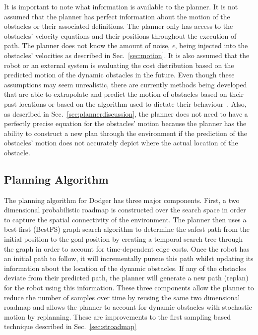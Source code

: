 \documentclass[letterpaper, 10pt, conference]{ieeeconf}
\begin{document}
It is important to note what information is available to the planner. It is not
assumed that the planner has perfect information about the motion of the
obstacles or their associated definitions. The planner only has access to the
obstacles' velocity equations and their positions throughout the execution of
path.  The planner does not know the amount of noise, $\epsilon$, being
injected into the obstacles' velocities as described in Sec.~\ref{sec:motion}.
It is also assumed that the robot or an external system is evaluating the cost
distribution based on the predicted motion of the dynamic obstacles in the
future. Even though these assumptions may seem unrealistic, there are currently
methods being developed that are able to extrapolate and predict the motion of
obstacles based on their past locations or based on the algorithm used to
dictate their behaviour~\cite{rus, cmu, boulder, edi1, edi2, keeper}. Also, as
described in Sec.~\ref{sec:plannerdiscussion}, the planner does not need to
have a perfectly precise equation for the obstacles' motion because the planner
has the ability to construct a new plan through the environment if the
prediction of the obstacles' motion does not accurately depict where the actual
location of the obstacle.

\subsection{Planning Algorithm}

\label{sec:design_planner}

The planning algorithm for Dodger has three major components. First, a two
dimensional probabilistic roadmap is constructed over the search space in order
to capture the spatial connectivity of the environment. The planner then uses a
best-first (BestFS) graph search algorithm to determine the safest path from
the initial position to the goal position by creating a temporal search tree
through the graph in order to account for time-dependent edge costs. Once the
robot has an initial path to follow, it will incrementally pursue this path
whilst updating its information about the location of the dynamic obstacles. If
any of the obstacles deviate from their predicted path, the planner will
generate a new path (replan) for the robot using this information. These three
components allow the planner to reduce the number of samples over time by
reusing the same two dimensional roadmap and allows the planner to account for
dynamic obstacles with stochastic motion by replanning. These are improvements
to the first sampling based technique described in Sec.~\ref{sec:stroadmap}
\end{document}
